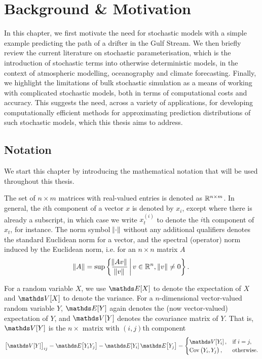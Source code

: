 
\chapter{Background \& Motivation}
In this chapter, we first motivate the need for stochastic models with a simple example predicting the path of a drifter in the Gulf Stream.
We then briefly review the current literature on stochastic parameterisation, which is the introduction of stochastic terms into otherwise deterministic models, in the context of atmospheric modelling, oceanography and climate forecasting.
Finally, we highlight the limitations of bulk stochastic simulation as a means of working with complicated stochastic models, both in terms of computational costs and accuracy.
This suggests the need, across a variety of applications, for developing computationally efficient methods for approximating prediction distributions of such stochastic models, which this thesis aims to address.


\section{Notation}
We start this chapter by introducing the mathematical notation that will be used throughout this thesis.

The set of \(n \times m\) matrices with real-valued entries is denoted as \(\mathbb{R}^{n\times m}\).
In general, the \(i\)th component of a vector \(x\) is denoted by \(x_{i}\), except where there is already a subscript, in which case we write \(x_t^{(i)}\) to denote the \(i\)th component of \(x_t\), for instance.
The norm symbol \(\norm{\cdot}\) without any additional qualifiers denotes the standard Euclidean norm for a vector, and the spectral (operator) norm induced by the Euclidean norm, i.e. for an \(n \times n\) matrix \(A\)
\[
	\norm{A} = \sup\left\{\frac{\norm{Av}}{\norm{v}}\,\middle|\,v \in \mathbb{R}^n, \, \norm{v} \neq 0\right\}.
\]


For a random variable \(X\), we use \(\avg{X}\) to denote the expectation of \(X\) and \(\var{X}\) to denote the variance.
For a \(n\)-dimensional vector-valued random variable \(Y\), \(\avg{Y}\) again denotes the (now vector-valued) expectation of \(Y\), and \(\var{Y}\) denotes the covariance matrix of \(Y\).
That is, \(\var{Y}\) is the \(n\times\) matrix with \((i,j)\)th component
\[
	\left[\var{Y}\right]_{ij} = \avg{Y_iY_j} - \avg{Y_i}\avg{Y_j} = \begin{cases}
		\var{Y_i},                         & \text{if } i = j, \\
		\mathrm{Cov}\left(Y_i, Y_j\right), & \text{otherwise}.
	\end{cases}
\]

